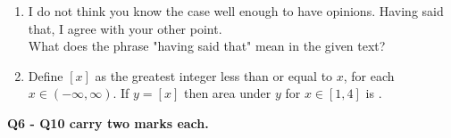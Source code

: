\documentclass[12pt,onecolumn]{article}
\begin{document}
\begin{enumerate}
    \item I do not think you know the case well enough to have opinions. Having said that, I agree with your other point.\\
          What does the phrase "having said that" mean in the given text?
          \begin{enumerate}
          \end{enumerate}

    \item Define $[x]$ as the greatest integer less than or equal to $x$, for each $x \in (-\infty, \infty)$. If $y = [x]$ then area under $y$ for $x \in [1, 4]$ is \underline{\hspace{2cm}}.
          \begin{enumerate}
          \end{enumerate}
\end{enumerate}
\normalsize\textbf{Q6 - Q10 carry two marks each.}
\end{document}
